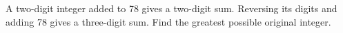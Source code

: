 A two-digit integer added to 78 gives a two-digit sum. Reversing its digits and adding 78 gives a three-digit sum. Find the greatest possible original integer.

